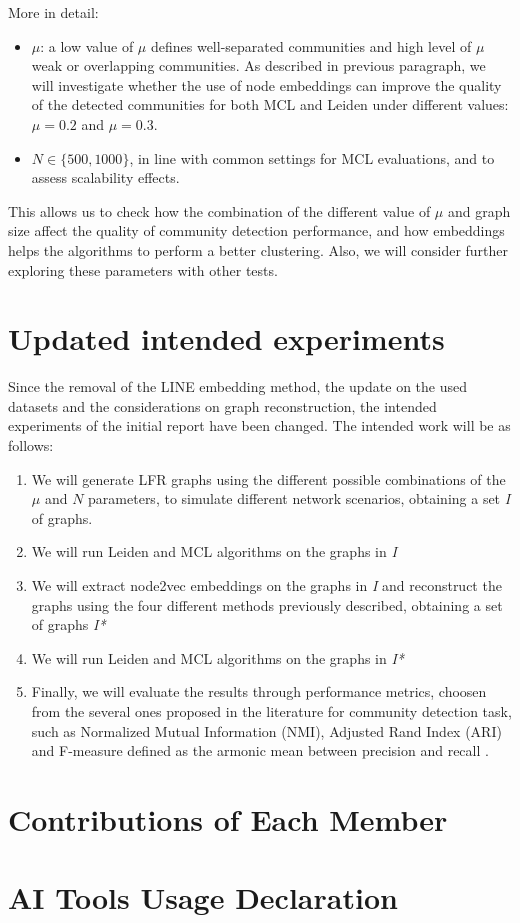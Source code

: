 \documentclass[a4paper,11pt]{article}
\begin{document}
More in detail:
\begin{itemize}
    \item $\mu$: a low value of $\mu$ defines well-separated communities and high level of $\mu$ weak or overlapping communities. As described in previous paragraph, we will investigate whether the use of node embeddings can improve the quality of the detected communities for both MCL and Leiden under different values: $\mu=0.2$ and $\mu=0.3$.
    \item $N \in \{500, 1000\}$, in line with common settings for MCL evaluations, and to assess scalability effects.
\end{itemize}

This allows us to check how the combination of the different value of $\mu$ and graph size affect the quality of community detection performance, and how embeddings helps the algorithms to perform a better clustering. Also, we will consider further exploring these parameters with other tests.

\section{Updated intended experiments}
Since the removal of the LINE embedding method, the update on the used datasets and the considerations on graph reconstruction, the intended experiments of the initial report have been changed. The intended work will be as follows:
\begin{enumerate}
    \item We will generate LFR graphs using the different possible combinations of the $\mu$ and $N$ parameters, to simulate different network scenarios, obtaining a set \textit{I} of graphs.
    \item We will run Leiden and MCL algorithms on the graphs in \textit{I}
    \item We will extract node2vec embeddings on the graphs in \textit{I} and reconstruct the graphs using the four different methods previously described, obtaining a set of graphs \textit{I*}
    \item We will run Leiden and MCL algorithms on the graphs in \textit{I*}
    \item Finally, we will evaluate the results through performance metrics, choosen from the several ones proposed in the literature for community detection task, such as Normalized Mutual Information (NMI), Adjusted Rand Index (ARI) and F-measure defined as the armonic mean between precision and recall \cite{malliaros2013clustering}.
\end{enumerate}

\newpage
 


\newpage
\section*{Contributions of Each Member}



\section*{AI Tools Usage Declaration}

 
\end{document}
